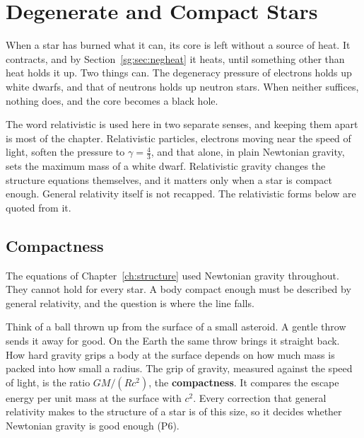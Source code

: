 \chapter{Degenerate and Compact Stars}
\label{ch:compact}



When a star has burned what it can, its core is left without a source of heat. It contracts, and by Section~\ref{sg:sec:negheat} it heats, until something other than heat holds it up. Two things can. The degeneracy pressure of electrons holds up white dwarfs, and that of neutrons holds up neutron stars. When neither suffices, nothing does, and the core becomes a black hole.

The word relativistic is used here in two separate senses, and keeping them apart is most of the chapter. Relativistic particles, electrons moving near the speed of light, soften the pressure to $\gamma=\tfrac43$, and that alone, in plain Newtonian gravity, sets the maximum mass of a white dwarf. Relativistic gravity changes the structure equations themselves, and it matters only when a star is compact enough. General relativity itself is not recapped. The relativistic forms below are quoted from it.

\section{Compactness}
\label{cs:sec:compactness}

The equations of Chapter~\ref{ch:structure} used Newtonian gravity throughout. They cannot hold for every star. A body compact enough must be described by general relativity, and the question is where the line falls.

Think of a ball thrown up from the surface of a small asteroid. A gentle throw sends it away for good. On the Earth the same throw brings it straight back. How hard gravity grips a body at the surface depends on how much mass is packed into how small a radius. The grip of gravity, measured against the speed of light, is the ratio $GM/(Rc^2)$, the \textbf{compactness}. It compares the escape energy per unit mass at the surface with $c^2$. Every correction that general relativity makes to the structure of a star is of this size, so it decides whether Newtonian gravity is good enough (P6).


